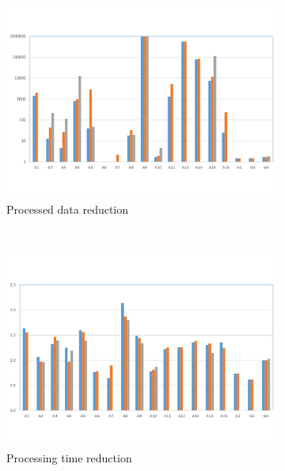 
\begin{figure}[t]
\centering

\begin{subfigure}[t]{\columnwidth}
\includegraphics[clip, trim=0.8cm 2cm 0.9cm 2.15cm,
width=\columnwidth]{graphs/data_red.pdf}
\caption{Processed data reduction}
\label{fig:data_red}
\end{subfigure}
~
\begin{subfigure}[t]{\columnwidth}
\includegraphics[clip, trim=0.8cm 2cm 0.9cm 2cm,
width=\columnwidth]{graphs/processing_red.pdf}
\caption{Processing time reduction}
\label{fig:processing_red}
\end{subfigure}
~
\begin{subfigure}[t]{\columnwidth}

\end{subfigure}
\end{figure}
